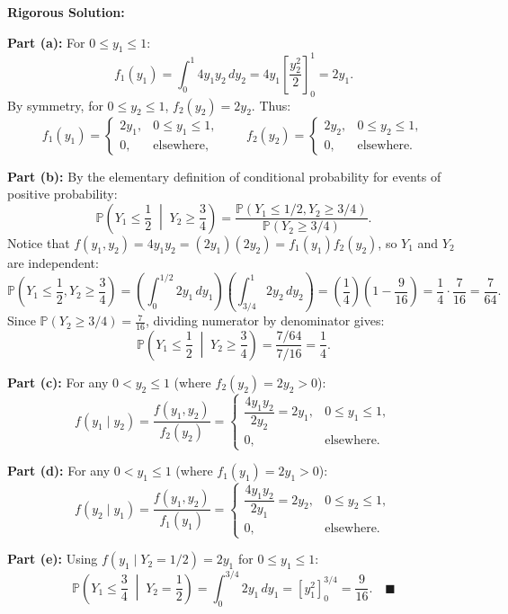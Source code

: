 \documentclass[11pt, letterpaper]{article}
\theoremstyle{definition}
\theoremstyle{remark}
\newcommand{\Prob}{\mathbb{P}}
\begin{document}
\textbf{Rigorous Solution:}

\textbf{Part (a):} For $0 \le y_1 \le 1$:
\[ f_1(y_1) = \int_0^1 4y_1 y_2 \, dy_2 = 4y_1 \left[ \frac{y_2^2}{2} \right]_0^1 = 2y_1. \]
By symmetry, for $0 \le y_2 \le 1$, $f_2(y_2) = 2y_2$. Thus:
\[ f_1(y_1) = \begin{cases} 2y_1, & 0 \le y_1 \le 1, \\ 0, & \text{elsewhere,} \end{cases} \qquad f_2(y_2) = \begin{cases} 2y_2, & 0 \le y_2 \le 1, \\ 0, & \text{elsewhere.} \end{cases} \]

\textbf{Part (b):} By the elementary definition of conditional probability for events of positive probability:
\[ \Prob\left(Y_1 \le \frac{1}{2} \;\middle|\; Y_2 \ge \frac{3}{4}\right) = \frac{\Prob(Y_1 \le 1/2, Y_2 \ge 3/4)}{\Prob(Y_2 \ge 3/4)}. \]
Notice that $f(y_1, y_2) = 4y_1 y_2 = (2y_1)(2y_2) = f_1(y_1)f_2(y_2)$, so $Y_1$ and $Y_2$ are independent:
\[ \Prob\left(Y_1 \le \frac{1}{2}, Y_2 \ge \frac{3}{4}\right) = \left(\int_0^{1/2} 2y_1 \, dy_1\right)\left(\int_{3/4}^1 2y_2 \, dy_2\right) = \left(\frac{1}{4}\right)\left(1 - \frac{9}{16}\right) = \frac{1}{4} \cdot \frac{7}{16} = \frac{7}{64}. \]
Since $\Prob(Y_2 \ge 3/4) = \frac{7}{16}$, dividing numerator by denominator gives:
\[ \Prob\left(Y_1 \le \frac{1}{2} \;\middle|\; Y_2 \ge \frac{3}{4}\right) = \frac{7/64}{7/16} = \frac{1}{4}. \]

\textbf{Part (c):} For any $0 < y_2 \le 1$ (where $f_2(y_2) = 2y_2 > 0$):
\[ f(y_1 \mid y_2) = \frac{f(y_1, y_2)}{f_2(y_2)} = \begin{cases} \dfrac{4y_1 y_2}{2y_2} = 2y_1, & 0 \le y_1 \le 1, \\ 0, & \text{elsewhere.} \end{cases} \]

\textbf{Part (d):} For any $0 < y_1 \le 1$ (where $f_1(y_1) = 2y_1 > 0$):
\[ f(y_2 \mid y_1) = \frac{f(y_1, y_2)}{f_1(y_1)} = \begin{cases} \dfrac{4y_1 y_2}{2y_1} = 2y_2, & 0 \le y_2 \le 1, \\ 0, & \text{elsewhere.} \end{cases} \]

\textbf{Part (e):} Using $f(y_1 \mid Y_2 = 1/2) = 2y_1$ for $0 \le y_1 \le 1$:
\[ \Prob\left(Y_1 \le \frac{3}{4} \;\middle|\; Y_2 = \frac{1}{2}\right) = \int_0^{3/4} 2y_1 \, dy_1 = \left[ y_1^2 \right]_0^{3/4} = \frac{9}{16}. \quad \blacksquare \]
\end{document}
